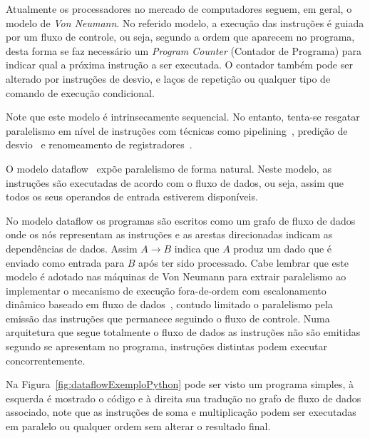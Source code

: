 Atualmente os processadores no mercado de computadores seguem, em geral, o modelo de \textit{Von Neumann}.
No referido modelo, a execução das instruções é guiada por um fluxo de controle, ou seja, segundo a ordem que aparecem no programa, desta forma se faz necessário um \textit{Program Counter} (Contador de Programa) para indicar qual a próxima instrução a ser executada.
O contador também pode ser alterado por instruções de desvio, e laços de repetição ou qualquer tipo de comando de execução condicional.

Note que este modelo é intrinsecamente sequencial. No entanto, tenta-se resgatar paralelismo em nível de instruções com técnicas como pipelining~\cite{patterson2003computerOrganization}, predição de desvio~\cite{patterson2003computerOrganization} e renomeamento de registradores~\cite{patterson2012}.

O modelo dataflow~\cite{2468, Swanson2003, 642111, Davis:1978:ASM:800094.803050, 714523, Shimada:1986:EPD:17356.17383, Kishi:1983:DDD:1067651.801661, Grafe:1989:EDP:74925.74930, 134511, Swanson:2007:WA:1233307.1233308} expõe paralelismo de forma natural.
Neste modelo, as instruções são executadas de acordo com o fluxo de dados, ou seja, assim que todos os seus operandos de entrada estiverem disponíveis.

No modelo dataflow os programas são escritos como um grafo de fluxo de dados onde os nós representam as instruções e as arestas direcionadas indicam as dependências de dados.
Assim $A \rightarrow B$ indica que $A$ produz um dado que é enviado como entrada para $B$ após ter sido processado.
Cabe lembrar que este modelo é adotado nas máquinas de Von Neumann para extrair paralelismo ao implementar o mecanismo de execução fora-de-ordem com escalonamento dinâmico baseado em fluxo de dados~\cite{tomasulo}, contudo limitado o paralelismo pela emissão das instruções que permanece seguindo o fluxo de controle.
Numa arquitetura que segue totalmente o fluxo de dados as instruções não são emitidas segundo se apresentam no programa, instruções distintas podem executar concorrentemente.

Na Figura~\ref{fig:dataflowExemploPython} pode ser visto um programa simples, à esquerda é mostrado o código e à direita sua tradução no grafo de fluxo de dados associado, note que as instruções de soma e multiplicação podem ser executadas em paralelo ou qualquer ordem sem alterar o resultado final.

